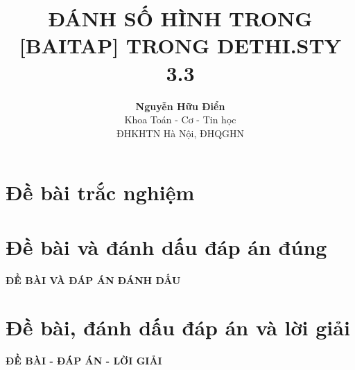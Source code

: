 \documentclass[12pt]{article}
\def\v#1{\overrightarrow{#1}}
\begin{document}
\setlength{\baselineskip}{11truept}
\def\v#1{\overrightarrow{#1}} %
\title{\bf ĐÁNH SỐ HÌNH TRONG [BAITAP] TRONG DETHI.STY 3.3} %
\author{{\bf Nguyễn Hữu Điển}\\
Khoa Toán - Cơ - Tin học\\
ĐHKHTN Hà Nội, ĐHQGHN
} %
\date{} %

\maketitle
\vspace*{1cm}

\tableofcontents

\newpage
 \section{Đề bài trắc nghiệm}
\indebai
\begin{enumerate}[]
\foreachproblem[bttracnghiem]{\item\causo\thisproblem}
% 
\end{enumerate}

\newpage
\section{Đề bài và đánh dấu đáp án đúng}
\setcounter{page}{1}
\setcounter{figure}{0}
\lamtieude
\begin{center}
{\bf ĐỀ BÀI VÀ ĐÁP ÁN ĐÁNH DẤU}
\end{center}
\indebaidapan
\begin{enumerate}[]
\foreachproblem[bttracnghiem]{\item\causo\thisproblem}
\end{enumerate}

\newpage
\section{Đề bài, đánh dấu đáp án và lời giải}
\setcounter{page}{1}
\setcounter{figure}{0}
\lamtieude
\indebailoigiai
\begin{center}
{\bf ĐỀ BÀI - ĐÁP ÁN - LỜI GIẢI}
\end{center}
\begin{enumerate}[]
\foreachproblem[bttracnghiem]{\item\causo\thisproblem}
\end{enumerate}
\end{document}
